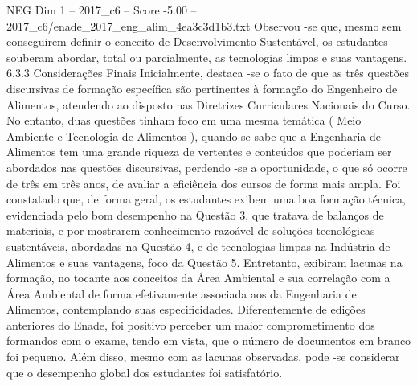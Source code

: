 \begin{textsample}{NEG Dim 1 – 2017\_c6 – Score -5.00 – 2017\_c6/enade\_2017\_eng\_alim\_4ea3c3d1b3.txt}
Observou -se que, mesmo sem conseguirem definir o conceito de Desenvolvimento Sustentável, os estudantes souberam abordar, total ou parcialmente, as tecnologias limpas e suas vantagens. 6.3.3 Considerações Finais Inicialmente, destaca -se o fato de que as três questões discursivas de formação específica são pertinentes à formação do Engenheiro de Alimentos, atendendo ao disposto nas Diretrizes Curriculares Nacionais do Curso.
No entanto, duas questões tinham foco em uma mesma temática ( Meio Ambiente e Tecnologia de Alimentos ), quando se sabe que a Engenharia de Alimentos tem uma grande riqueza de vertentes e conteúdos que poderiam ser abordados nas questões discursivas, perdendo -se a oportunidade, o que só ocorre de três em três anos, de avaliar a eficiência dos cursos de forma mais ampla.
Foi constatado que, de forma geral, os estudantes exibem uma boa formação técnica, evidenciada pelo bom desempenho na Questão 3, que tratava de balanços de materiais, e por mostrarem conhecimento razoável de soluções tecnológicas sustentáveis, abordadas na Questão 4, e de tecnologias limpas na Indústria de Alimentos e suas vantagens, foco da Questão 5.
Entretanto, exibiram lacunas na formação, no tocante aos conceitos da Área Ambiental e sua correlação com a Área Ambiental de forma efetivamente associada aos da Engenharia de Alimentos, contemplando suas especificidades.
Diferentemente de edições anteriores do Enade, foi positivo perceber um maior comprometimento dos formandos com o exame, tendo em vista, que o número de documentos em branco foi pequeno.
Além disso, mesmo com as lacunas observadas, pode -se considerar que o desempenho global dos estudantes foi satisfatório.

\end{textsample}
